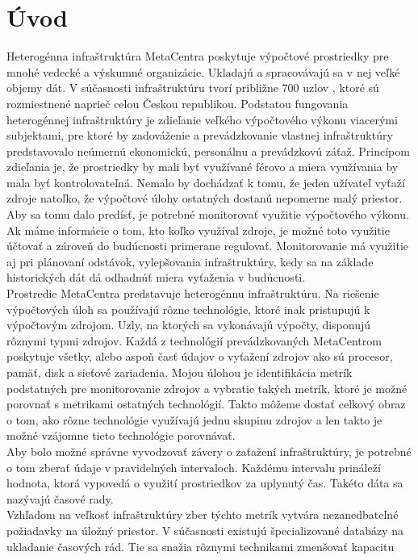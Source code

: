 \documentclass[printed,11pt,twoside,color,cover,table]{fithesis3}
\begin{document}
\chapter{Úvod}
Heterogénna infraštruktúra MetaCentra poskytuje výpočtové prostriedky pre mnohé vedecké a výskumné organizácie. Ukladajú a spracovávajú sa v nej veľké objemy dát. V súčasnosti infraštruktúru
tvorí približne 700 uzlov \cite{metacentrum_size}, ktoré sú rozmiestnené naprieč celou
Českou republikou. Podstatou fungovania heterogénnej infraštruktúry je zdieľanie veľkého výpočtového výkonu viacerými subjektami, pre ktoré by zadováženie a prevádzkovanie vlastnej infraštruktúry predstavovalo neúmernú 
ekonomickú, personálnu a prevádzkovú záťaž. Princípom zdieľania je, že prostriedky by mali byť využívané férovo a miera využívania by
mala byť kontrolovateľná. Nemalo by dochádzať k tomu, že jeden užívateľ vyťaží zdroje natoľko, že 
výpočtové úlohy ostatných dostanú nepomerne malý priestor. Aby sa tomu dalo predísť, je potrebné monitorovať využitie výpočtového výkonu. Ak máme informácie o tom, kto koľko využíval zdroje, 
je možné toto využitie účtovať a zároveň do budúcnosti primerane regulovať. Monitorovanie má využitie aj pri plánovaní
odstávok, vylepšovania infraštruktúry, kedy sa na základe historických dát dá odhadnúť miera vyťaženia v budúcnosti.
\\Prostredie MetaCentra predstavuje heterogénnu infraštruktúru. Na riešenie výpočtových úloh sa používajú rôzne technológie, ktoré inak pristupujú k výpočtovým zdrojom. 
Uzly, na ktorých sa vykonávajú výpočty, disponujú rôznymi typmi zdrojov. Každá z technológií prevádzkovaných MetaCentrom poskytuje všetky, alebo aspoň časť údajov 
o vyťažení zdrojov ako sú procesor, pamäť, disk a sieťové zariadenia. Mojou úlohou je identifikácia metrík podstatných pre monitorovanie 
zdrojov a vybratie takých metrík, ktoré je možné porovnať s metrikami ostatných technológií. Takto môžeme dostať celkový obraz o tom, ako rôzne technológie využívajú jednu skupinu zdrojov a len takto je 
možné vzájomne tieto technológie porovnávať.
\\Aby bolo možné správne vyvodzovať závery o zaťažení infraštruktúry, je potrebné o tom zberať údaje v pravidelných intervaloch. Každému intervalu 
prináleží hodnota, ktorá vypovedá o využití prostriedkov za uplynutý čas. Takéto dáta sa nazývajú časové rady.
\\Vzhľadom na veľkosť infraštruktúry zber týchto metrík vytvára nezanedbateľné požiadavky na úložný priestor. 
V súčasnosti existujú špecializované databázy na ukladanie časových rád. Tie sa snažia rôznymi technikami zmenšovať kapacitu
\end{document}

